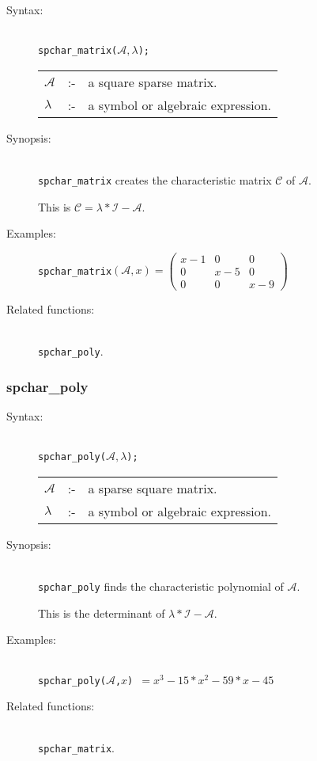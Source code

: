 \begin{description}
\item[Syntax:]\mbox{}\\
\texttt{spchar\_matrix($\mathcal{A},\lambda$);}\\[2mm]
\begin{tabular}{l l l}
$\mathcal{A}$ &:-& a square sparse matrix. \\
$\lambda$  &:-& a symbol or algebraic expression.
\end{tabular}

\item[Synopsis:]\mbox{}\\
\texttt{spchar\_matrix} creates the characteristic matrix $\mathcal{C}$ of
$\mathcal{A}$.

This is $\mathcal{C} = \lambda * \mathcal{I} - \mathcal{A}$.

\item[Examples:]
\begin{flushleft}
\texttt{spchar\_matrix}\((\mathcal{A},x) =
\begin{pmatrix} x-1 & 0 & 0 \\ 0 & x-5 & 0 \\ 0 & 0 & x-9 \end{pmatrix}
\)
\end{flushleft}

\item[Related functions:]\mbox{}\\
\texttt{spchar\_poly}.
\end{description}

\subsubsection{spchar\_poly}
\label{sparse:spchar_poly}

\begin{description}
\item[Syntax:]\mbox{}\\
\texttt{spchar\_poly($\mathcal{A},\lambda$);}\\[2mm]
\begin{tabular}{l l l}
$\mathcal{A}$ &:-& a sparse square matrix. \\
$\lambda$ &:-& a symbol or algebraic expression.
\end{tabular}

\item[Synopsis:]\mbox{}\\
\texttt{spchar\_poly} finds the characteristic polynomial of
                $\mathcal{A}$.

This is the determinant of $\lambda * \mathcal{I} - \mathcal{A}$.

\item[Examples:]\mbox{}\\
\texttt{spchar\_poly($\mathcal{A}$,$x$) $= x^3-15*x^2-59*x-45$}

\item[Related functions:]\mbox{}\\
\texttt{spchar\_matrix}.
\end{description}

